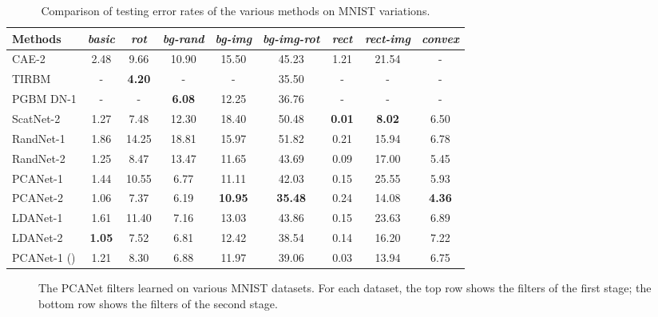 \documentclass[10pt,journal,compsoc]{IEEEtran}
\begin{document}
\begin{table*}\centering
\caption{Comparison of testing error rates  of the various methods on MNIST variations.}
\vspace{0.1cm}\centering\begin{tabular}{l|c|c|c|c|c|c|c|c}
  \hline
Methods        & {\it basic} & {\it rot}             & {\it bg-rand} & {\it bg-img} & {\it bg-img-rot} & {\it rect} & {\it rect-img} & {\it convex} \\ \hline \hline
  CAE-2 \cite{Rifai2011}        &  2.48  & 9.66         & 10.90       &  15.50     & 45.23       & 1.21 & 21.54 & - \\
  TIRBM \cite{Sohn2012}         &  -     & {\bf 4.20}   &   -         &    -       & 35.50       &   -      &    -   &  - \\
  PGBM  DN-1  \cite{Sohn2013}&   -    &      -       & {\bf 6.08}  &   12.25    &  36.76      & -   &   - &  - \\
  ScatNet-2 \cite{Bruna2013}    & 1.27   & 7.48         &  12.30      & 18.40      & 50.48       & {\bf 0.01} & {\bf 8.02} & 6.50 \\ \hline
  RandNet-1                     &   1.86 & 14.25        &    18.81    & 15.97      &  51.82      &  0.21  &  15.94 &   6.78 \\
  RandNet-2                     & 1.25   & 8.47         &    13.47    & 11.65      &  43.69      &  0.09  &  17.00  &  5.45   \\
  PCANet-1                      & 1.44   & 10.55        &  6.77       & 11.11      & 42.03       & 0.15  & 25.55  & 5.93 \\
  PCANet-2                      & 1.06   & 7.37         &  6.19       & {\bf 10.95}& {\bf 35.48} & 0.24 & 14.08 & {\bf 4.36} \\
  LDANet-1                      & 1.61   &   11.40      &     7.16    &  13.03     &   43.86     &    0.15 &   23.63 &    6.89 \\
  LDANet-2                      &{\bf 1.05} & 7.52      &     6.81    &  12.42     &   38.54     &    0.14 &   16.20 &    7.22 \\ \hline
  PCANet-1 ()         & 1.21   & 8.30         & 6.88        &  11.97     &   39.06    &    0.03  &  13.94  &  6.75  \\
  \hline
\end{tabular}\label{table: mnist}
\end{table*}

\begin{figure*}[t]
\centering
{}
\caption{The PCANet filters learned on various MNIST datasets. For each dataset, the top row shows the filters of the first stage; the bottom row shows the filters of the second stage.} \label{fig: mnist_filters}
\end{figure*}
\end{document}
